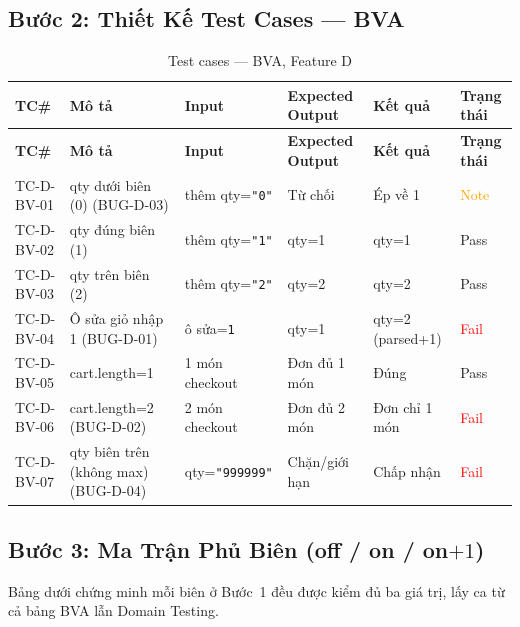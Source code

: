 \documentclass[12pt, a4paper]{report}
\begin{document}
\subsection{Bước 2: Thiết Kế Test Cases — BVA}
\begin{longtable}{C{1.2cm} L{3.2cm} L{3.1cm} L{3cm} C{1.9cm} C{1.4cm}}
    \caption{Test cases — BVA, Feature D} \\
    \toprule
    \textbf{TC\#} & \textbf{Mô tả} & \textbf{Input} & \textbf{Expected Output} & \textbf{Kết quả} & \textbf{Trạng thái} \\
    \midrule
    \endfirsthead
    \toprule
    \textbf{TC\#} & \textbf{Mô tả} & \textbf{Input} & \textbf{Expected Output} & \textbf{Kết quả} & \textbf{Trạng thái} \\
    \midrule
    \endhead
    \bottomrule
    \endlastfoot
    TC-D-BV-01 & qty dưới biên (0) \newline (BUG-D-03) & thêm qty=\texttt{"0"} & Từ chối & Ép về 1 & \textcolor{orange}{Note} \\
    TC-D-BV-02 & qty đúng biên (1) & thêm qty=\texttt{"1"} & qty=1 & qty=1 & \textcolor{green!60!black}{Pass} \\
    TC-D-BV-03 & qty trên biên (2) & thêm qty=\texttt{"2"} & qty=2 & qty=2 & \textcolor{green!60!black}{Pass} \\
    TC-D-BV-04 & Ô sửa giỏ nhập 1 \newline (BUG-D-01) & ô sửa=\texttt{1} & qty=1 & qty=2 (parsed+1) & \textcolor{red}{Fail} \\
    TC-D-BV-05 & cart.length=1 & 1 món checkout & Đơn đủ 1 món & Đúng & \textcolor{green!60!black}{Pass} \\
    TC-D-BV-06 & cart.length=2 \newline (BUG-D-02) & 2 món checkout & Đơn đủ 2 món & Đơn chỉ 1 món & \textcolor{red}{Fail} \\
    TC-D-BV-07 & qty biên trên (không max) \newline (BUG-D-04) & qty=\texttt{"999999"} & Chặn/giới hạn & Chấp nhận & \textcolor{red}{Fail} \\
\end{longtable}

\subsection{Bước 3: Ma Trận Phủ Biên (off / on / on$+1$)}
Bảng dưới chứng minh mỗi biên ở Bước~1 đều được kiểm đủ ba giá trị, lấy ca từ cả bảng BVA lẫn
Domain Testing.
\end{document}
